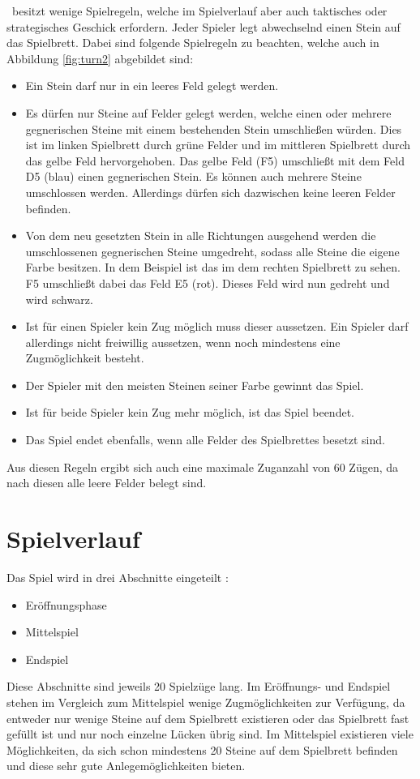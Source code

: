\ot\ besitzt wenige Spielregeln, welche im Spielverlauf aber auch taktisches oder strategisches Geschick erfordern. Jeder Spieler legt abwechselnd einen Stein auf das Spielbrett. Dabei sind folgende Spielregeln zu beachten, welche auch in Abbildung \ref{fig:turn2} abgebildet sind:
\begin{itemize}
\item Ein Stein darf nur in ein leeres Feld gelegt werden.
\item Es dürfen nur Steine auf Felder gelegt werden, welche einen oder mehrere gegnerischen Steine mit einem bestehenden Stein umschließen würden. Dies ist im linken Spielbrett durch grüne Felder und im mittleren Spielbrett durch das gelbe Feld hervorgehoben. Das gelbe Feld (F5) umschließt mit dem Feld D5 (blau) einen gegnerischen Stein. Es können auch mehrere Steine umschlossen werden. Allerdings dürfen sich dazwischen keine leeren Felder befinden.
\item Von dem neu gesetzten Stein in alle Richtungen ausgehend werden die umschlossenen gegnerischen Steine umgedreht, sodass alle Steine die eigene Farbe besitzen. In dem Beispiel ist das im dem rechten Spielbrett zu sehen. F5 umschließt dabei das Feld E5 (rot). Dieses Feld wird nun gedreht und wird schwarz.
\item Ist für einen Spieler kein Zug möglich muss dieser aussetzen. Ein Spieler darf allerdings nicht freiwillig aussetzen, wenn noch mindestens eine Zugmöglichkeit besteht.
\item Der Spieler mit den meisten Steinen seiner Farbe gewinnt das Spiel.
\item Ist für beide Spieler kein Zug mehr möglich, ist das Spiel beendet. 
\item Das Spiel endet ebenfalls, wenn alle Felder des Spielbrettes besetzt sind.
\end{itemize}
Aus diesen Regeln ergibt sich auch eine maximale Zuganzahl von 60 Zügen, da nach diesen alle leere Felder belegt sind.
\newpage
\section{Spielverlauf}
Das Spiel wird in drei Abschnitte eingeteilt \cite{Ortiz.}:
\begin{itemize}
\item Eröffnungsphase
\item Mittelspiel
\item Endspiel
\end{itemize}
Diese Abschnitte sind jeweils 20 Spielzüge lang.
Im Eröffnungs- und Endspiel stehen im Vergleich zum Mittelspiel wenige Zugmöglichkeiten zur Verfügung, da entweder nur wenige Steine auf dem Spielbrett existieren oder das Spielbrett fast gefüllt ist und nur noch einzelne Lücken übrig sind. Im Mittelspiel existieren viele Möglichkeiten, da sich schon mindestens 20 Steine auf dem Spielbrett befinden und diese sehr gute Anlegemöglichkeiten bieten. 
